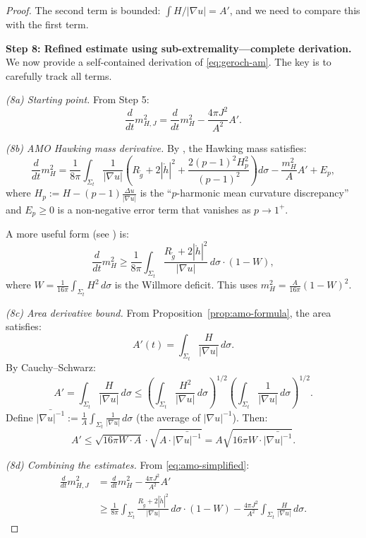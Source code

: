 \documentclass[12pt]{article}
\theoremstyle{plain}
\theoremstyle{definition}
\theoremstyle{remark}
\newcommand{\tg}{\tilde{g}}
\begin{document}
\begin{proof}
The second term is bounded: $\int H/|\nabla u| = A'$, and we need to compare this with the first term.

\textbf{Step 8: Refined estimate using sub-extremality---complete derivation.}
We now provide a self-contained derivation of \eqref{eq:geroch-am}. The key is to carefully track all terms.

\textit{(8a) Starting point.} From Step 5:
\[
\frac{d}{dt}m_{H,J}^2 = \frac{d}{dt}m_H^2 - \frac{4\pi J^2}{A^2}A'.
\]

\textit{(8b) AMO Hawking mass derivative.} By \cite[Theorem 4.1]{amo2022}, the Hawking mass satisfies:
\begin{equation}\label{eq:amo-hawking-deriv}
\frac{d}{dt}m_H^2 = \frac{1}{8\pi}\int_{\Sigma_t}\frac{1}{|\nabla u|}\left(R_{\tg} + 2|\mathring{h}|^2 + \frac{2(p-1)^2 H_p^2}{(p-1)^2}\right)d\sigma - \frac{m_H^2}{A}A' + E_p,
\end{equation}
where $H_p := H - (p-1)\frac{\Delta u}{|\nabla u|}$ is the ``$p$-harmonic mean curvature discrepancy'' and $E_p \geq 0$ is a non-negative error term that vanishes as $p \to 1^+$.

A more useful form (see \cite[Eq. (4.15)]{amo2022}) is:
\begin{equation}\label{eq:amo-simplified}
\frac{d}{dt}m_H^2 \geq \frac{1}{8\pi}\int_{\Sigma_t}\frac{R_{\tg} + 2|\mathring{h}|^2}{|\nabla u|}\,d\sigma \cdot \left(1 - W\right),
\end{equation}
where $W = \frac{1}{16\pi}\int_{\Sigma_t}H^2\,d\sigma$ is the Willmore deficit. This uses $m_H^2 = \frac{A}{16\pi}(1-W)^2$.

\textit{(8c) Area derivative bound.} From Proposition~\ref{prop:amo-formula}, the area satisfies:
\[
A'(t) = \int_{\Sigma_t}\frac{H}{|\nabla u|}\,d\sigma.
\]
By Cauchy--Schwarz:
\[
A' = \int_{\Sigma_t}\frac{H}{|\nabla u|}\,d\sigma \leq \left(\int_{\Sigma_t}\frac{H^2}{|\nabla u|}\,d\sigma\right)^{1/2}\left(\int_{\Sigma_t}\frac{1}{|\nabla u|}\,d\sigma\right)^{1/2}.
\]
Define $\bar{|\nabla u|^{-1}} := \frac{1}{A}\int_{\Sigma_t}\frac{1}{|\nabla u|}\,d\sigma$ (the average of $|\nabla u|^{-1}$). Then:
\[
A' \leq \sqrt{16\pi W \cdot A}\cdot\sqrt{A\cdot \bar{|\nabla u|^{-1}}} = A\sqrt{16\pi W \cdot \bar{|\nabla u|^{-1}}}.
\]

\textit{(8d) Combining the estimates.} From \eqref{eq:amo-simplified}:
\begin{align}
\frac{d}{dt}m_{H,J}^2 &= \frac{d}{dt}m_H^2 - \frac{4\pi J^2}{A^2}A' \\
&\geq \frac{1}{8\pi}\int_{\Sigma_t}\frac{R_{\tg} + 2|\mathring{h}|^2}{|\nabla u|}\,d\sigma \cdot (1-W) - \frac{4\pi J^2}{A^2}\int_{\Sigma_t}\frac{H}{|\nabla u|}\,d\sigma.
\end{align}


\end{proof}
\end{document}
